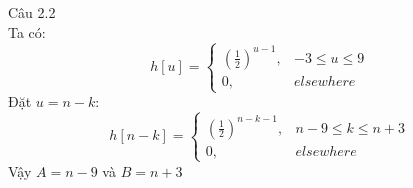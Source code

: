 \documentclass[11pt]{exam}
\begin{document}
\begin{questions}

\question Câu 2.2 \\
    Ta có:
    \begin{equation*}
        h[u] = 
        \begin{cases}
            \left(\frac{1}{2}\right)^{u-1}, & -3 \leq u \leq 9 \\
            0, & elsewhere
        \end{cases}
    \end{equation*}
    Đặt $u = n - k$:
    \begin{equation*}
        h[n-k] = 
        \begin{cases}
            \left(\frac{1}{2}\right)^{n-k-1}, & n-9 \leq k \leq n+3 \\
            0, & elsewhere
        \end{cases}
    \end{equation*}
    Vậy $A = n - 9$ và $ B = n + 3$


\end{questions}
\end{document}

